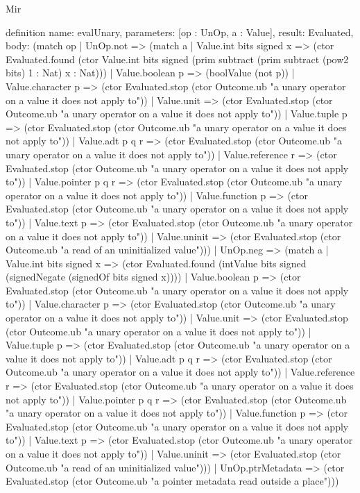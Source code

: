 \begin{lexlean}{Mir}
\begin{semanticmodule}
definition{
  name: evalUnary,
  parameters: [op : UnOp, a : Value],
  result: Evaluated,
  body: (match op
    | UnOp.not => (match a
      | Value.int bits signed x => (ctor Evaluated.found (ctor Value.int bits signed (prim subtract (prim subtract (pow2 bits) 1 : Nat) x : Nat)))
      | Value.boolean p => (boolValue (not p))
      | Value.character p => (ctor Evaluated.stop (ctor Outcome.ub "a unary operator on a value it does not apply to"))
      | Value.unit => (ctor Evaluated.stop (ctor Outcome.ub "a unary operator on a value it does not apply to"))
      | Value.tuple p => (ctor Evaluated.stop (ctor Outcome.ub "a unary operator on a value it does not apply to"))
      | Value.adt p q r => (ctor Evaluated.stop (ctor Outcome.ub "a unary operator on a value it does not apply to"))
      | Value.reference r => (ctor Evaluated.stop (ctor Outcome.ub "a unary operator on a value it does not apply to"))
      | Value.pointer p q r => (ctor Evaluated.stop (ctor Outcome.ub "a unary operator on a value it does not apply to"))
      | Value.function p => (ctor Evaluated.stop (ctor Outcome.ub "a unary operator on a value it does not apply to"))
      | Value.text p => (ctor Evaluated.stop (ctor Outcome.ub "a unary operator on a value it does not apply to"))
      | Value.uninit => (ctor Evaluated.stop (ctor Outcome.ub "a read of an uninitialized value")))
    | UnOp.neg => (match a
      | Value.int bits signed x => (ctor Evaluated.found (intValue bits signed (signedNegate (signedOf bits signed x))))
      | Value.boolean p => (ctor Evaluated.stop (ctor Outcome.ub "a unary operator on a value it does not apply to"))
      | Value.character p => (ctor Evaluated.stop (ctor Outcome.ub "a unary operator on a value it does not apply to"))
      | Value.unit => (ctor Evaluated.stop (ctor Outcome.ub "a unary operator on a value it does not apply to"))
      | Value.tuple p => (ctor Evaluated.stop (ctor Outcome.ub "a unary operator on a value it does not apply to"))
      | Value.adt p q r => (ctor Evaluated.stop (ctor Outcome.ub "a unary operator on a value it does not apply to"))
      | Value.reference r => (ctor Evaluated.stop (ctor Outcome.ub "a unary operator on a value it does not apply to"))
      | Value.pointer p q r => (ctor Evaluated.stop (ctor Outcome.ub "a unary operator on a value it does not apply to"))
      | Value.function p => (ctor Evaluated.stop (ctor Outcome.ub "a unary operator on a value it does not apply to"))
      | Value.text p => (ctor Evaluated.stop (ctor Outcome.ub "a unary operator on a value it does not apply to"))
      | Value.uninit => (ctor Evaluated.stop (ctor Outcome.ub "a read of an uninitialized value")))
    | UnOp.ptrMetadata => (ctor Evaluated.stop (ctor Outcome.ub "a pointer metadata read outside a place")))
}


\end{semanticmodule}
\end{lexlean}
